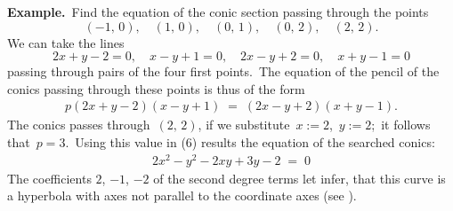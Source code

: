 \documentclass[12pt]{article}
\theoremstyle{definition}
\begin{document}
\textbf{Example.}\, Find the equation of the conic section passing through the points
$$(-1,\,0), \quad (1,\,0), \quad (0,\,1), \quad (0,\,2), \quad (2,\,2).$$
We can take the lines
$$2x+y-2 = 0, \quad x-y+1 = 0, \quad 2x-y+2 = 0, \quad x+y-1 = 0$$
passing through pairs of the four first points.\, The equation of the pencil of the conics passing through these points is thus of the form
\begin{align}
p(2x+y-2)(x-y+1) \;=\; (2x-y+2)(x+y-1).
\end{align}
The conics passes through\, $(2,\,2)$, if we substitute\, $x := 2$,\, $y := 2$;\, it follows that\, $p = 3$.\, 
Using this value in (6) results the equation of the searched conics:
\begin{align}
2x^2-y^2-2xy+3y-2 \;=\; 0
\end{align}
The coefficients $2$, $-1$, $-2$ of the second degree terms let infer, that this curve is a hyperbola with axes not parallel to the coordinate axes (see ).




\end{document}
